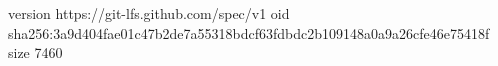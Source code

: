 version https://git-lfs.github.com/spec/v1
oid sha256:3a9d404fae01c47b2de7a55318bdcf63fdbdc2b109148a0a9a26cfe46e75418f
size 7460
